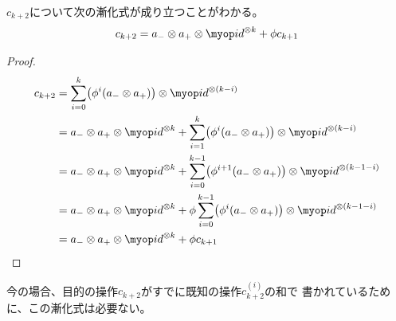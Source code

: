 	$c_{k+2}$について次の漸化式が成り立つことがわかる。
	\begin{equation}\label{eq:cの漸化式}\begin{split} %
		c_{k+2} = a_-\otimes a_+\otimes\id^{\otimes k} + \phi c_{k+1}
	\end{split}\end{equation} %
	\begin{proof} %
		\begin{equation*}\begin{split} %
			c_{k+2} &= \sum_{i=0}^k
				\bigl(\phi^i(a_-\otimes a_+)\bigr)\otimes\id^{\otimes(k-i)} \\
			&= a_-\otimes a_+\otimes\id^{\otimes k}
				+ \sum_{i=1}^k
				\bigl(\phi^i(a_-\otimes a_+)\bigr)\otimes\id^{\otimes(k-i)} \\
			&= a_-\otimes a_+\otimes\id^{\otimes k}
				+ \sum_{i=0}^{k-1} \bigl(\phi^{i+1}(a_-\otimes a_+)\bigr)
				\otimes\id^{\otimes(k-1-i)} \\
			&= a_-\otimes a_+\otimes\id^{\otimes k}
				+ \phi\sum_{i=0}^{k-1} \bigl(\phi^{i}(a_-\otimes a_+)\bigr)
				\otimes\id^{\otimes(k-1-i)} \\
			&= a_-\otimes a_+\otimes\id^{\otimes k} + \phi c_{k+1} \\
		\end{split}\end{equation*} %
	\end{proof} %
	今の場合、目的の操作$c_{k+2}$がすでに既知の操作$c_{k+2}^{(i)}$の和で
	書かれているために、この漸化式は必要ない。

